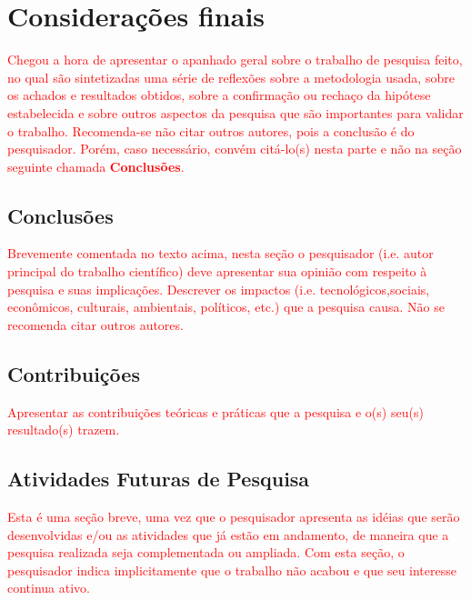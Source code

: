\chapter{Considera\c{c}\~oes finais}
\label{chapter:consideracoesfinais}

\textcolor{red}{Chegou a hora de apresentar o apanhado geral sobre o trabalho de
pesquisa feito, no qual s\~ao sintetizadas uma s\'erie de
reflex\~oes sobre a metodologia usada, sobre os achados e
resultados obtidos, sobre a confirma\c{c}\~ao ou recha\c{c}o da
hip\'otese estabelecida e sobre outros aspectos da pesquisa que
s\~ao importantes para validar o trabalho. Recomenda-se n\~ao
citar outros autores, pois a conclus\~ao \'e do pesquisador.
Por\'em, caso necess\'ario, conv\'em cit\'a-lo(s) nesta parte e
n\~ao na se\c{c}\~ao seguinte chamada \textbf{Conclus\~oes}.}


\section{Conclus\~oes}
\label{section:conclusoes}

\textcolor{red}{Brevemente comentada no texto acima, nesta se\c{c}\~ao o
pesquisador (i.e. autor principal do trabalho cient\'ifico) deve
apresentar sua opini\~ao com respeito \`a pesquisa e suas
implica\c{c}\~oes. Descrever os impactos (i.e.
tecnol\'ogicos,sociais, econ\^omicos, culturais, ambientais,
políticos, etc.) que a pesquisa causa. N\~ao se recomenda citar
outros autores.}


\section{Contribui\c{c}\~oes}
\label{section:contribuicoes}

\textcolor{red}{Apresentar as contribui\c{c}\~oes te\'oricas e pr\'aticas que a
pesquisa e o(s) seu(s) resultado(s) trazem.}



\section{Atividades Futuras de Pesquisa}
\label{section:atividadesfuturaspesquisa}

\textcolor{red}{Esta \'e uma se\c{c}\~ao breve, uma vez que o pesquisador
apresenta as id\'eias que ser\~ao desenvolvidas e/ou as atividades
que j\'a est\~ao em andamento, de maneira que a pesquisa realizada
seja complementada ou ampliada. Com esta se\c{c}\~ao, o
pesquisador indica implicitamente que o trabalho n\~ao acabou e
que seu interesse continua ativo.}
